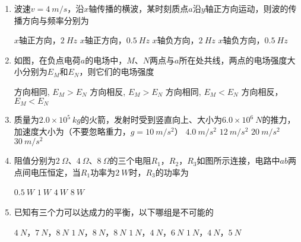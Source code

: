\begin{enumerate}
\item
波速$ v=4 \ m /s $，沿$ x $轴传播的横波，某时刻质点$ a $沿$ y $轴正方向运动，则波的传播方向与频率分别为  
\begin{figure}[h!]
	\centering
	
\end{figure}

\fourchoices
{$ x $轴正方向，$ 2 \ Hz $}
{$ x $轴正方向，$ 0.5 \ Hz $}
{$ x $轴负方向，$ 2 \ Hz $}
{$ x $轴负方向，$ 0.5 \ Hz $}





\item
如图，在负点电荷$ a $的电场中，$ M $、$ N $两点与$ a $所在处共线，两点的电场强度大小分别为$ E_M $和$ E_N $，则它们的电场强度  
\begin{figure}[h!]
	\centering
	
\end{figure}


\fourchoices
{方向相同, $E_{M}>E_{N}$}
{方向相反, $E_{M}>E_{N}$}
{方向相同, $E_{M}<E_{N}$}
{方向相反，$E_{M}<E_{N}$}





\item
质量为$ 2.0 \times 10^{5} \ kg $的火箭，发射时受到竖直向上、大小为$ 6.0 \times 10^{6} \ N $的推力，加速度大小为（不要忽略重力，$ g=10 \ m/s^{2} $）  
\fourchoices
{$ 4.0 \ m/s^{2} $}
{$ 12 \ m/s^{2} $}
{$ 20 \ m/s^{2} $}
{$ 30 \ m/s^{2} $}




\item
阻值分别为$ 2 \ \Omega $、$ 4 \ \Omega $、$ 8 \ \Omega $的三个电阻$ R_{1} $，$ R_{2} $，$ R_{3} $如图所示连接，电路中$ ab $两点间电压恒定，当$ R_{1} $功率为$ 2 \ W $时，$ R_{3} $的功率为  
\begin{figure}[h!]
	\centering
	
\end{figure}

\fourchoices
{$ 0.5 \ W $}
{$ 1 \ W $}
{$ 4 \ W $}
{$ 8 \ W $}




\item
已知有三个力可以达成力的平衡，以下哪组是不可能的  

\fourchoices
{$ 4 \ N $，$ 7 \ N $，$ 8 \ N $}
{$ 1 \ N $，$ 8 \ N $，$ 8 \ N $}
{$ 1 \ N $，$ 4 \ N $，$ 6 \ N $}
{$ 1 \ N $，$ 4 \ N $，$ 5 \ N $}




\end{enumerate}
